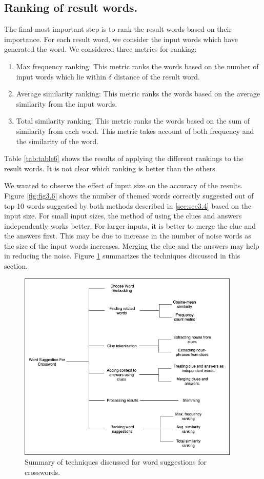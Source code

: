 \documentclass[twoside]{article}
\begin{document}
\subsection{Ranking of result words.}
\label{sec:sec3.6}
The final most important step is to rank the result words based on their importance. For each result word, we consider the input words which have generated the word. We considered three metrics for ranking:
\begin{enumerate}
  \item Max frequency ranking: This metric ranks the words based on the number of input words which lie within $\delta$ distance of the result word.
  \item Average similarity ranking: This metric ranks the words based on the average similarity from the input words.
  \item Total similarity ranking: This metric ranks the words based on the sum of similarity from each word. This metric takes account of both frequency and the similarity of the word.
\end{enumerate}
Table \ref{tab:table6} shows the results of applying the different rankings to the result words. It is not clear which ranking is better than the others.

We wanted to observe the effect of input size on the accuracy of the results. Figure \ref{fig:fig3.6} shows the number of themed words correctly suggested out of top 10 words suggested by both methods described in \ref{sec:sec3.4} based on the input size. For small input sizes, the method of using the clues and answers independently works better. For larger inputs, it is better to merge the clue and the answers first. This may be due to increase in the number of noise words as the size of the input words increases. Merging the clue and the answers may help in reducing the noise. Figure \ref{fig:fig3.6.1} summarizes the techniques discussed in this section.

\begin{figure}
  \centering
  \includegraphics[width=300pt]{images/method_summary.png}
  \caption{Summary of techniques discussed for word suggestions for crosswords.}
  \label{fig:fig3.6.1}
\end{figure}
\end{document}

